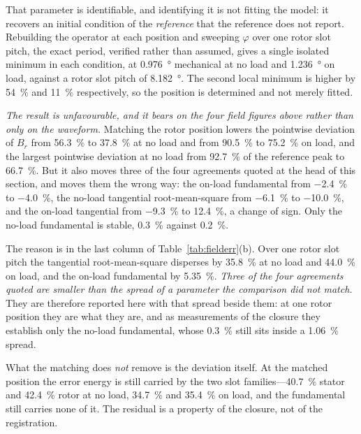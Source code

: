 \documentclass[10pt,a4paper,twocolumn]{article}
\theoremstyle{plain}
\theoremstyle{remark}
\begin{document}
That parameter is identifiable, and identifying it is not fitting the
model: it recovers an initial condition of the \emph{reference} that the
reference does not report. Rebuilding the operator at each position and
sweeping $\varphi$ over one rotor slot pitch, the exact period, verified
rather than assumed, gives a single isolated minimum in each condition,
at \SI{0.976}{\degree} mechanical at no load and \SI{1.236}{\degree} on
load, against a rotor slot pitch of \SI{8.182}{\degree}. The second
local minimum is higher by \SI{54}{\percent} and \SI{11}{\percent}
respectively, so the position is determined and not merely fitted.

\emph{The result is unfavourable, and it bears on the four field figures
above rather than only on the waveform.} Matching the rotor position
lowers the pointwise deviation of $B_r$ from \SI{56.3}{\percent} to
\SI{37.8}{\percent} at no load and from \SI{90.5}{\percent} to
\SI{75.2}{\percent} on load, and the largest pointwise deviation at no
load from \SI{92.7}{\percent} of the reference peak to
\SI{66.7}{\percent}. But it also moves three of the four agreements
quoted at the head of this section, and moves them the wrong way: the
on-load fundamental from \SI{-2.4}{\percent} to \SI{-4.0}{\percent}, the
no-load tangential root-mean-square from \SI{-6.1}{\percent} to
\SI{-10.0}{\percent}, and the on-load tangential from
\SI{-9.3}{\percent} to \SI{+12.4}{\percent}, a change of sign. Only the
no-load fundamental is stable, \SI{+0.3}{\percent} against
\SI{+0.2}{\percent}.

The reason is in the last column of Table~\ref{tab:fielderr}(b). Over
one rotor slot pitch the tangential root-mean-square disperses by
\SI{35.8}{\percent} at no load and \SI{44.0}{\percent} on load, and the
on-load fundamental by \SI{5.35}{\percent}. \emph{Three of the four
agreements quoted are smaller than the spread of a parameter the
comparison did not match.} They are therefore reported here with that
spread beside them: at one rotor position they are what they are, and as
measurements of the closure they establish only the no-load fundamental,
whose \SI{0.3}{\percent} still sits inside a \SI{1.06}{\percent} spread.

What the matching does \emph{not} remove is the deviation itself. At the
matched position the error energy is still carried by the two slot
families---\SI{40.7}{\percent} stator and \SI{42.4}{\percent} rotor at no
load, \SI{34.7}{\percent} and \SI{35.4}{\percent} on load, and the
fundamental still carries none of it. The residual is a property of the
closure, not of the registration.
\end{document}
